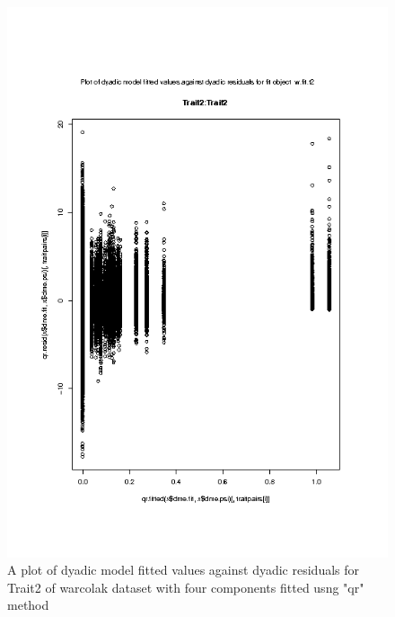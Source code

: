 %

\begin{figure}[h]
  \centering
  \includegraphics[width=1.1\textwidth]{Rplot003.png}
  \caption{A plot of dyadic model fitted values against dyadic residuals
     for Trait2 of warcolak dataset with four components fitted usng "qr" method}
  \label{fig:3}
\end{figure}

%

